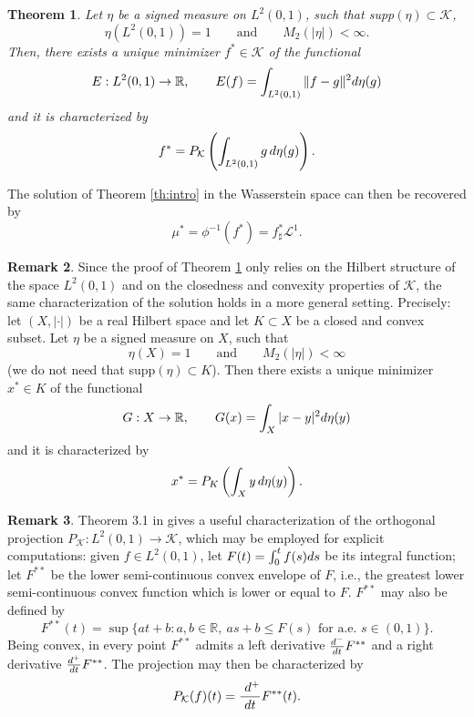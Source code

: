 \documentclass[12pt,a4paper]{article}
\newcommand{\R}{\mathbb{R}}
\renewcommand{\d}{{\rm d}}
\newcommand{\K}{\mathcal{K}}
\theoremstyle{plain}
\newtheorem{theorem}{Theorem}[section]
\theoremstyle{definition}
\newtheorem{remark}[theorem]{Remark}
\begin{document}
\begin{theorem}
\label{th:1d}
Let $\eta$ be a signed measure on $L^2(0,1)$, such that supp$(\eta)\subset \K$,
\[
	\eta (L^2(0,1))=1\qquad \text{and}\qquad M_2(|\eta |)<\infty.
\]
Then, there exists a unique minimizer $f^* \in \K$ of the functional 
\[	
	E:L^2(0,1) \to \R,\qquad E(f) = \int_{L^2(0,1)}  \|f-g\|^2\d\eta(g)
\]
and it is characterized by
\[
	 f^* = P_\K\left( \int_{L^2(0,1)}g\,\d\eta(g)\right).
\]
\end{theorem}
The solution of Theorem \ref{th:intro} in the Wasserstein space can then be recovered by 
\[
	\mu^* =\phi^{-1}( f^*) =  f^*_\sharp \mathcal{L}^1.
\]	
\begin{remark}
\label{rem:general}
    Since the proof of Theorem \ref{th:1d} only relies on the Hilbert structure of the space $L^2(0,1)$ and on the closedness and convexity properties of $\K$, the same characterization of the solution holds in a more general setting. Precisely: let $(X,|\cdot|)$ be a real Hilbert space and let $K\subset X$ be a closed and convex subset. Let $\eta$ be a signed measure on $X$, such that 
 \begin{equation}
 \label{eq:hyp_gen}
 	\eta (X)=1\qquad \text{and}\qquad M_2(|\eta|)<\infty
\end{equation}	 
(we do not need that supp$(\eta)\subset K$). Then there exists a unique minimizer $x^* \in K$ of the functional 
\[
	G:X \to \R,\qquad G(x) = \int_X |x-y|^2\d\eta(y)
\]
and it is characterized by
\[
	 x^* = P_K\left( \int_X y\,\d\eta(y)\right).
\]
\end{remark}

\begin{remark}
    Theorem 3.1 in \cite{natile-savare} gives a useful characterization of the orthogonal projection $P_\K : L^2(0,1) \to \K$, which may be employed for explicit computations: given $f \in L^2(0,1)$, let $F(t) = \int_0^t f(s) \d s$ be its integral function; let $F^{**}$ be the lower semi-continuous convex envelope of $F$, i.e., the greatest lower semi-continuous convex function which is lower or equal to $F$. $F^{**}$ may also be defined by
    \[
    F^{**}(t) = \sup\{at + b : a,b\in \R,\ as + b \leq F(s) \text{ for a.e. } s \in (0,1)\}.
    \]
Being convex, in every point $F^{**}$ admits a left derivative $\frac{\\d^-}{\d t}F^{**}$ and a right derivative $\frac{\d^+}{\d t}F^{**}$. The projection may then be characterized by
    \[
    P_\K(f) (t) = \frac{\ \d^+}{\d t} F^{**}(t).
    \]
\end{remark}
\end{document}
